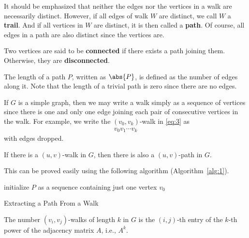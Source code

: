 \documentclass[thmcnt=section, 12pt, color=cyan]{my-elegantbook}
\begin{document}
It should be emphasized that neither the edges nor the vertices in a walk are necessarily distinct. However, if all edges of walk $W$ are distinct, we call $W$ a \textbf{trail}. And if all vertices in $W$ are distinct, it is then called a \textbf{path}. Of course, all edges in a path are also distinct since the vertices are.

Two vertices are said to be \textbf{connected} if there exists a path joining them. Otherwise, they are \textbf{disconnected}. 

The length of a path $P$, written as $\abs{P}$, is defined as the number of edges along it. Note that the length of a trivial path is zero since there are no edges.

If $G$ is a simple graph, then we may write a walk simply as a sequence of vertices since there is one and only one edge joining each pair of consecutive vertices in the walk. For example, we write the $(v_0, v_k)$-walk in \eqref{eq:3} as 
\begin{align*}
    v_0 v_1 \cdots v_k
\end{align*}
with edges dropped.


\begin{proposition} \label{pro:7}
    If there is a $(u, v)$-walk in $G$, then there is also a $(u, v)$-path in $G$.
\end{proposition}

This can be proved easily using the following algorithm (Algorithm~\ref{alg:1}).

\begin{algorithm}[ht]
    initialize $P$ as a sequence containing just one vertex $v_0$ \;
    \caption{Extracting a Path From a Walk}
    \label{alg:1}
\end{algorithm}


\begin{proposition}
    The number $(v_i, v_j)$-walks of length $k$ in $G$ is the $(i,j)$-th entry of the $k$-th power of the adjacency matrix $A$, i.e., $A^k$.
\end{proposition}
\end{document}
